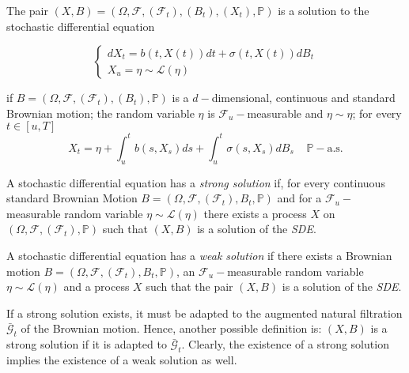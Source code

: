 \begin{definition}
    The pair $(X,B) = (\Omega, \mathcal{F}, (\mathcal{F}_t), (B_t), (X_t), \mathbb{P})$ is a solution to the stochastic differential equation

    \begin{equation*}
    \begin{cases}
        dX_t = b(t,X(t)) dt + \sigma(t,X(t))dB_t \\
        X_u = \eta \sim \mathcal{L}(\eta)
    \end{cases}
    \end{equation*}

    if $B = (\Omega, \mathcal{F}, (\mathcal{F}_t), (B_t), \mathbb{P})$ is a $d-$dimensional, continuous and standard Brownian motion; the random variable $\eta$ is $\mathcal{F}_u-$measurable and $\eta \sim \mathcal{\eta}$; for every $t \in [u,T]$
    \begin{equation*}
        X_t = \eta + \int_u^t b(s,X_s) ds + \int_u^t \sigma(s,X_s) dB_s \;\;\;\; \mathbb{P}-\text{a.s.}
    \end{equation*}
\end{definition}

\begin{definition}
    A stochastic differential equation has a \textit{strong solution} if, for every continuous standard Brownian Motion $B = (\Omega, \mathcal{F},(\mathcal{F}_t),B_t,\mathbb{P})$ and for a $\mathcal{F}_u-$measurable random variable $\eta \sim \mathcal{L}(\eta)$ there exists a process $X$ on $(\Omega,\mathcal{F},(\mathcal{F}_t),\mathbb{P})$ such that $(X,B)$ is a solution of the \textit{SDE}. 
\end{definition}

\begin{definition}
    A stochastic differential equation has a \textit{weak solution} if there exists a Brownian motion $B = (\Omega, \mathcal{F},(\mathcal{F}_t),B_t,\mathbb{P})$, an $\mathcal{F}_u-$measurable random variable $\eta \sim \mathcal{L}(\eta)$ and a process $X$ such that the pair $(X,B)$ is a solution of the \textit{SDE}. 
\end{definition}


If a strong solution exists, it must be adapted to the augmented natural filtration $\bar{\mathcal{G}}_t$ of the Brownian motion. Hence, another possible definition is: $(X,B)$ is a strong solution if it is adapted to $\bar{\mathcal{G}}_t$. Clearly, the existence of a strong solution implies the existence of a weak solution as well. 

